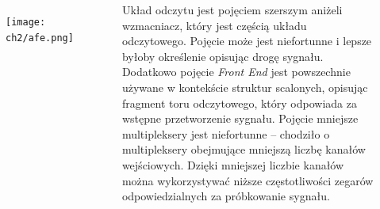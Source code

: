\begin{frame}[t]
    \begin{block}{\dk}
    \end{block}

    \begin{columns}
        \vspace{-1em}
        \begin{figure}[H]
            \texttt{[image: ch2/afe.png]}
        \end{figure}

        {\renewcommand\normalsize{\small}%
        \normalsize
            Układ odczytu jest pojęciem szerszym aniżeli wzmacniacz, który jest częścią układu odczytowego. 
            Pojęcie może jest niefortunne i lepsze byłoby określenie  opisując drogę sygnału. 
            Dodatkowo pojęcie \textit{Front End} jest powszechnie używane w kontekście struktur scalonych, opisując fragment toru odczytowego, który odpowiada za wstępne przetworzenie sygnału.
            Pojęcie mniejsze multipleksery jest niefortunne -- chodziło o multipleksery obejmujące mniejszą liczbę kanałów wejściowych. 
            Dzięki mniejszej liczbie kanałów można wykorzystywać niższe częstotliwości zegarów odpowiedzialnych za próbkowanie sygnału.
        }
    \end{columns}
    
\end{frame}



